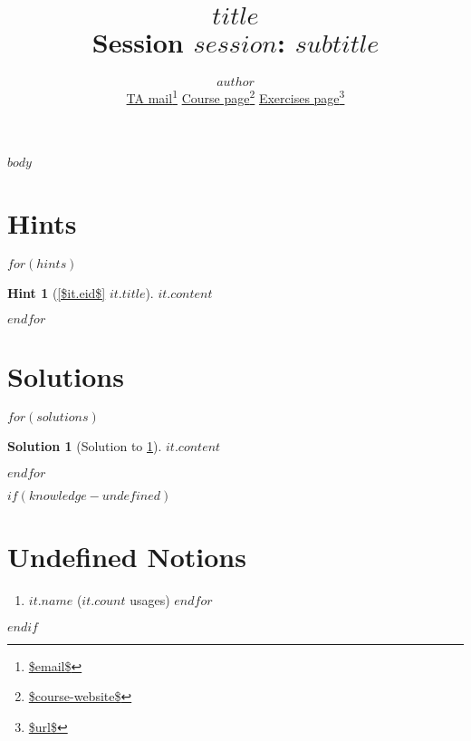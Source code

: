 \documentclass[a4,10pt]{article}
\title{{\bfseries \Huge{$title$}} \\ Session $session$: $subtitle$}
\author{$author$ \\
        \href{mailto:$email$}{TA mail}\footnote{\url{$email$}}
        \hspace{1em}
        \href{$course-website$}{Course page}\footnote{\url{$course-website$}}
        \hspace{1em}
        \href{$url$}{Exercises page}\footnote{\url{$url$}}
}
\newtheorem{hint}{Hint}
\newtheorem{solution}{Solution}
\begin{document}
\maketitle

$body$

\clearpage
\appendix

\section{Hints}

$for(hints)$
\begin{hint}[{\cref{$it.eid$} $it.title$}]
    \label{$it.id$}
    $it.content$
\end{hint}
$endfor$

\clearpage
\section{Solutions}

$for(solutions)$
\begin{solution}[Solution to \cref{$it.id$}]
    \label{$it.id$:solution}
    $it.content$
\end{solution}
$endfor$

$if(knowledge-undefined)$
\clearpage
\section{Undefined Notions}
\begin{enumerate}
$for(knowledge-undefined)$
\item \texttt{$it.name$} ($it.count$ usages)
$endfor$
\end{enumerate}
$endif$
\end{document}

